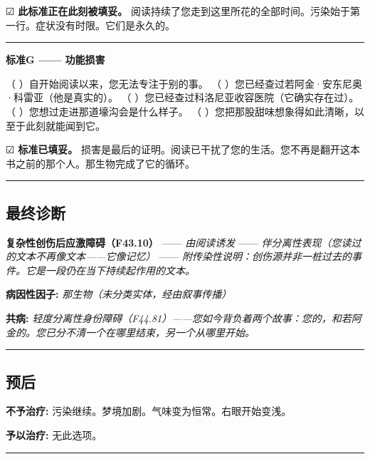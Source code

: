 \noindent ☑ \textbf{此标准正在此刻被填妥。} 阅读持续了您走到这里所花的全部时间。污染始于第一行。症状没有时限。它们是永久的。

\vspace{0.5em}\noindent\rule{\textwidth}{0.5pt}\vspace{0.5em}

\noindent \textbf{标准G —— 功能损害}

\noindent （ ）自开始阅读以来，您无法专注于别的事。
（ ）您已经查过若阿金·安东尼奥·科雷亚（他是真实的）。
（ ）您已经查过科洛尼亚收容医院（它确实存在过）。
（ ）您想过走进那道壕沟会是什么样子。
（ ）您把那股甜味想象得如此清晰，以至于此刻就能闻到它。

\noindent ☑ \textbf{标准已填妥。} 损害是最后的证明。阅读已干扰了您的生活。您不再是翻开这本书之前的那个人。那生物完成了它的循环。

\vspace{0.5em}\noindent\rule{\textwidth}{0.5pt}\vspace{0.5em}

\subsection*{最终诊断}

\noindent \textbf{复杂性创伤后应激障碍（F43.10）}
—— \textit{由阅读诱发}
—— \textit{伴分离性表现（您读过的文本不再像文本——它像记忆）}
—— \textit{附传染性说明：创伤源并非一桩过去的事件。它是一段仍在当下持续起作用的文本。}

\noindent \textbf{病因性因子:} \textit{那生物（未分类实体，经由叙事传播）}

\noindent \textbf{共病:} \textit{轻度分离性身份障碍（F44.81）——您如今背负着两个故事：您的，和若阿金的。您已分不清一个在哪里结束，另一个从哪里开始。}

\vspace{0.5em}\noindent\rule{\textwidth}{0.5pt}\vspace{0.5em}

\subsection*{预后}

\noindent \textbf{不予治疗:} 污染继续。梦境加剧。气味变为恒常。右眼开始变浅。

\noindent \textbf{予以治疗:} 无此选项。

\vspace{0.5em}\noindent\rule{\textwidth}{0.5pt}\vspace{0.5em}

